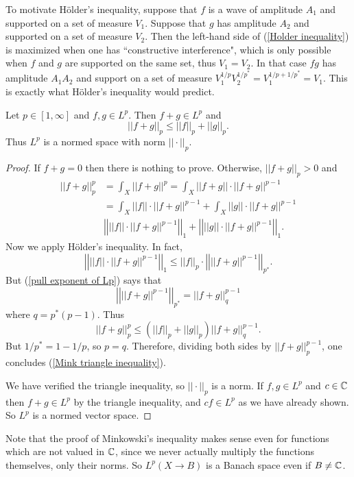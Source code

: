 To motivate H\"older's inequality, suppose that $f$ is a wave of amplitude $A_1$ and supported on a set of measure $V_1$.
Suppose that $g$ has amplitude $A_2$ and supported on a set of measure $V_2$.
Then the left-hand side of (\ref{Holder inequality}) is maximized when one has ``constructive interference", which is only possible when $f$ and $g$ are supported on the same set, thus $V_1 = V_2$.
In that case $fg$ has amplitude $A_1A_2$ and support on a set of measure $V_1^{1/p}V_2^{1/p^*} = V_1^{1/p+1/p^*} = V_1$.
This is exactly what H\"older's inequality would predict.

\begin{theorem}
Let $p \in [1, \infty]$ and $f, g \in L^p$. Then $f + g \in L^p$ and
\begin{equation}
\label{Mink triangle inequality}
||f + g||_p \leq ||f||_p + ||g||_p.
\end{equation}
Thus $L^p$ is a normed space with norm $||\cdot||_p$.
\end{theorem}
\begin{proof}
If $f + g = 0$ then there is nothing to prove.
Otherwise, $||f + g||_p > 0$ and
\begin{align*}
||f + g||_p^p &= \int_X ||f + g||^p = \int_X ||f + g||\cdot ||f + g||^{p-1} \\
&= \int_X ||f||\cdot ||f + g||^{p-1} + \int_X ||g||\cdot ||f + g||^{p-1}\\
&\left|\left|||f||\cdot ||f + g||^{p-1}\right|\right|_1 + \left|\left|||g||\cdot ||f + g||^{p-1}\right|\right|_1.
\end{align*}
Now we apply H\"older's inequality. In fact,
$$\left|\left|||f||\cdot ||f + g||^{p-1}\right|\right|_1 \leq ||f||_p \cdot \left|\left|||f + g||^{p-1}\right|\right|_{p^*}.$$
But (\ref{pull exponent of Lp}) says that
$$\left|\left|||f + g||^{p-1}\right|\right|_{p^*} = ||f + g||_q^{p - 1}$$
where $q = p^*(p-1)$. Thus
$$||f + g||_p^p \leq (||f||_p + ||g||_p) ||f + g||_q^{p - 1}.$$
But $1/p^* = 1 - 1/p$, so $p = q$. Therefore, dividing both sides by $||f + g||_p^{p - 1}$, one concludes (\ref{Mink triangle inequality}).

We have verified the triangle inequality, so $||\cdot||_p$ is a norm. If $f, g \in L^p$ and $c \in \mathbb{C}$ then $f + g \in L^p$ by the triangle inequality, and $cf \in L^p$ as we have already shown.
So $L^p$ is a normed vector space.
\end{proof}
Note that the proof of Minkowski's inequality makes sense even for functions which are not valued in $\mathbb{C}$, since we never actually multiply the functions themselves, only their norms. So $L^p(X \to B)$ is a Banach space even if $B \neq \mathbb{C}$.


